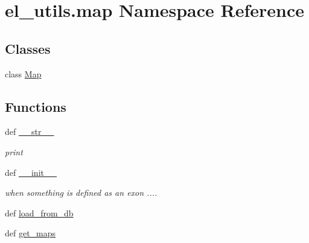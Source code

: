 \hypertarget{namespaceel__utils_1_1map}{\section{el\-\_\-utils.\-map Namespace Reference}
\label{namespaceel__utils_1_1map}
}
\subsection*{Classes}
\begin{DoxyCompactItemize}
\item 
class \hyperlink{classel__utils_1_1map_1_1Map}{Map}
\end{DoxyCompactItemize}
\subsection*{Functions}
\begin{DoxyCompactItemize}
\item 
def \hyperlink{namespaceel__utils_1_1map_a4b235b7a528d8ff42e14295a153c4faa}{\-\_\-\-\_\-str\-\_\-\-\_\-}
\begin{DoxyCompactList}\small\item\em print \end{DoxyCompactList}\item 
def \hyperlink{namespaceel__utils_1_1map_aac37351a1cd1510393c5f6805cfc24d8}{\-\_\-\-\_\-init\-\_\-\-\_\-}
\begin{DoxyCompactList}\small\item\em when something is defined as an exon .... \end{DoxyCompactList}\item 
def \hyperlink{namespaceel__utils_1_1map_aa1e6b27ce1783adb2f0172b9915a9778}{load\-\_\-from\-\_\-db}
\item 
def \hyperlink{namespaceel__utils_1_1map_a181a0602644d7f239efc3e1c404425bf}{get\-\_\-maps}
\end{DoxyCompactItemize}
